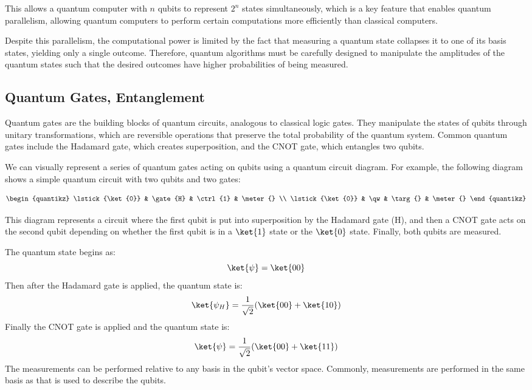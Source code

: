 This allows a quantum computer with $n$ qubits to represent $2^n$ states simultaneously, which is a key feature that enables quantum parallelism, allowing quantum computers to perform certain computations more efficiently than classical computers.

Despite this parallelism, the computational power is limited by the fact that measuring a quantum state collapses it to one of its basis states, yielding only a single outcome. Therefore, quantum algorithms must be carefully designed to manipulate the amplitudes of the quantum states such that the desired outcomes have higher probabilities of being measured.

\subsection{Quantum Gates, Entanglement}

Quantum gates are the building blocks of quantum circuits, analogous to classical logic gates. They manipulate the states of qubits through unitary transformations, which are reversible operations that preserve the total probability of the quantum system. Common quantum gates include the Hadamard gate, which creates superposition, and the CNOT gate, which entangles two qubits. 

We can visually represent a series of quantum gates acting on qubits using a quantum circuit diagram. For example, the following diagram shows a simple quantum circuit with two qubits and two gates:

$$\begin{quantikz}
    \lstick{\ket{0}} & \gate{H} & \ctrl{1} & \meter{} \\
    \lstick{\ket{0}} & \qw      & \targ{}  & \meter{}
\end{quantikz}$$

This diagram represents a circuit where the first qubit is put into superposition by the Hadamard gate (H), and then a CNOT gate acts on the second qubit depending on whether the first qubit is in a \(\ket{1}\) state or the \(\ket{0}\) state. Finally, both qubits are measured. 

The quantum state begins as:
$$\ket{\psi}=\ket{00}$$
Then after the Hadamard gate is applied, the quantum state is:
$$\ket{\psi_H}=\frac{1}{\sqrt{2}}(\ket{00} + \ket{10})$$
Finally the CNOT gate is applied and the quantum state is:
$$\ket{\psi} = \frac{1}{\sqrt{2}}(\ket{00} + \ket{11})$$
The measurements can be performed relative to any basis in the qubit's vector space. Commonly, measurements are performed in the same basis as that is used to describe the qubits.

